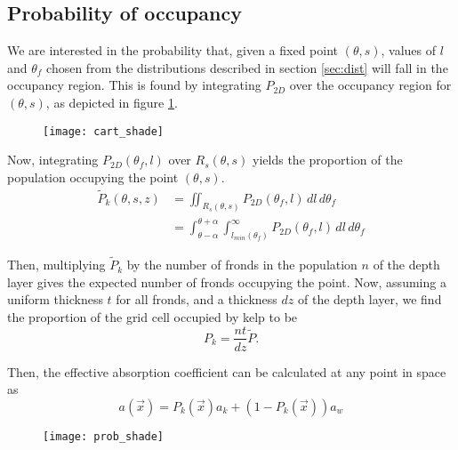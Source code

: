 \subsection{Probability of occupancy}
We are interested in the probability that, given a fixed point $(\theta,s)$, values of $l$ and $\theta_f$ chosen from the distributions described in section \ref{sec:dist} will fall in the occupancy region.
This is found by integrating $P_{2D}$ over the occupancy region for $(\theta,s)$, as depicted in figure \ref{fig:cart_shade}.

\begin{figure}[h]
	\centering
	\texttt{[image: cart\_shade]}
	\vspace{-3em}
	\label{fig:cart_shade}
\end{figure}

Now, integrating $P_{2D}(\theta_f,l)$ over $R_s(\theta,s)$ yields the proportion of the population occupying the point $(\theta,s)$.
\begin{align}
		\tilde{P}_k(\theta,s,z)	&= \iint_{R_s(\theta,s)}
								P_{2D}(\theta_f,l)
								\,dl\,d\theta_f \nonumber \\
							&= \int_{\theta-\alpha}^{\theta+\alpha} 
								\int_{l_{min}(\theta_f)}^\infty
								P_{2D}(\theta_f,l)
								\,dl\,d\theta_f
\end{align}

Then, multiplying $\tilde{P}_k$ by the number of fronds in the population $n$ of the depth layer gives the expected number of fronds occupying the point.
Now, assuming a uniform thickness $t$ for all fronds, and a thickness $dz$ of the depth layer, we find the proportion of the grid cell occupied by kelp to be
\begin{equation}
  P_k = \frac{nt}{dz}\tilde{P}.
\end{equation}

Then, the effective absorption coefficient can be calculated at any point in space as
\begin{equation}
  a(\vec{x}) = P_k(\vec{x})a_k + (1-P_k(\vec{x}))a_w
\end{equation}

\begin{figure}[h]
	\centering
	\texttt{[image: prob\_shade]}
	\vspace{-2em}
	\label{fig:prob_shade}
\end{figure}
